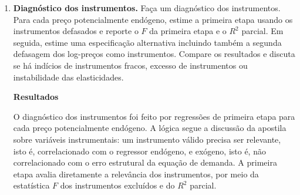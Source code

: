 \documentclass[12pt,a4paper]{article}
\begin{document}
\begin{enumerate}[label=\textbf{\arabic*.}]
A simetria também é rejeitada ao nível de \(5\%\), embora com evidência menos forte. Isso sugere que os efeitos cruzados estimados entre produtos não obedecem perfeitamente à reciprocidade esperada pela teoria. Como discutido na Questão~6, essa rejeição não significa simplesmente que duas elasticidades cruzadas são diferentes, pois as elasticidades também dependem das participações médias. Ela indica que a estrutura paramétrica \(\gamma_{gk}=\gamma_{kg}\) não é plenamente compatível com os dados.

A Tabela~\ref{tab:comparacao-modelos} deve ser lida em conjunto com a Tabela~\ref{tab:testes-wald}. A imposição de homogeneidade e simetria aumenta a disciplina teórica e reduz o número de parâmetros, mas também aumenta a estatística objetivo do GMM e os graus de liberdade de sobreidentificação. Essa tensão entre ajuste empírico e coerência teórica é comum em sistemas de demanda. No presente caso, a rejeição das restrições é compatível com os sinais problemáticos observados nas Tabelas~\ref{tab:elasticidades-marshallianas} e~\ref{tab:elasticidades-compensadas}, especialmente na linha dos pescados.

Assim, o modelo com homogeneidade e simetria deve ser interpretado como uma especificação teoricamente disciplinada, útil para organizar as elasticidades, mas não como uma descrição sem tensões empíricas. Os resultados indicam que a teoria do consumidor ajuda a estruturar a estimação, mas a base de carnes apresenta padrões que não se ajustam perfeitamente a todas as restrições do AIDS.

\item \textbf{Diagnóstico dos instrumentos.}
Faça um diagnóstico dos instrumentos. Para cada preço potencialmente endógeno, estime a primeira etapa usando os instrumentos defasados e reporte o \(F\) da primeira etapa e o \(R^2\) parcial. Em seguida, estime uma especificação alternativa incluindo também a segunda defasagem dos log-preços como instrumentos. Compare os resultados e discuta se há indícios de instrumentos fracos, excesso de instrumentos ou instabilidade das elasticidades.

\textbf{Resultados}

O diagnóstico dos instrumentos foi feito por regressões de primeira etapa para cada preço potencialmente endógeno. A lógica segue a discussão da apostila sobre variáveis instrumentais: um instrumento válido precisa ser relevante, isto é, correlacionado com o regressor endógeno, e exógeno, isto é, não correlacionado com o erro estrutural da equação de demanda. A primeira etapa avalia diretamente a relevância dos instrumentos, por meio da estatística \(F\) dos instrumentos excluídos e do \(R^2\) parcial.


\end{enumerate}
\end{document}
